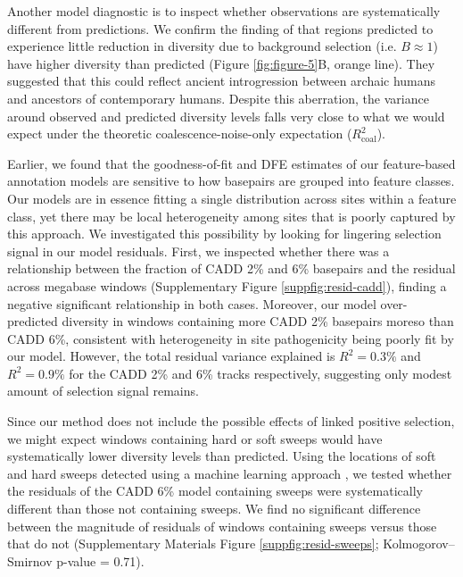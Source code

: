 \documentclass[11pt]{article}
\begin{document}
Another model diagnostic is to inspect whether observations are systematically
different from predictions. We confirm the finding of \textcite{Murphy2022-sj}
that regions predicted to experience little reduction in diversity due to
background selection (i.e. $B\approx 1$) have higher diversity than predicted
(Figure \ref{fig:figure-5}B, orange line). They suggested that this could
reflect ancient introgression between archaic humans and ancestors of
contemporary humans. Despite this aberration, the variance around observed and
predicted diversity levels falls very close to what we would expect under the
theoretic coalescence-noise-only expectation ($R_\text{coal}^2$).

Earlier, we found that the goodness-of-fit and DFE estimates of our
feature-based annotation models are sensitive to how basepairs are grouped into
feature classes. Our models are in essence fitting a single distribution across
sites within a feature class, yet there may be local heterogeneity among sites
that is poorly captured by this approach. We investigated this possibility by
looking for lingering selection signal in our model residuals. First, we
inspected whether there was a relationship between the fraction of CADD 2\% and
6\% basepairs and the residual across megabase windows (Supplementary Figure
\ref{suppfig:resid-cadd}), finding a negative significant relationship in
both cases. Moreover, our model over-predicted diversity in windows containing
more CADD 2\% basepairs moreso than CADD 6\%, consistent with heterogeneity in
site pathogenicity being poorly fit by our model. However, the total residual
variance explained is $R^2 = 0.3\%$ and $R^2 = 0.9\%$ for the CADD 2\% and 6\%
tracks respectively, suggesting only modest amount of selection signal remains.

Since our method does not include the possible effects of linked positive
selection, we might expect windows containing hard or soft sweeps would have
systematically lower diversity levels than predicted. Using the locations of
soft and hard sweeps detected using a machine learning approach
\parencite{Schrider2017-yx,Kern2018-jd}, we tested whether the residuals of the
CADD 6\% model containing sweeps were systematically different than those not
containing sweeps. We find no significant difference between the magnitude of
residuals of windows containing sweeps versus those that do not (Supplementary
Materials Figure \ref{suppfig:resid-sweeps}; Kolmogorov--Smirnov p-value =
0.71). 
\end{document}
